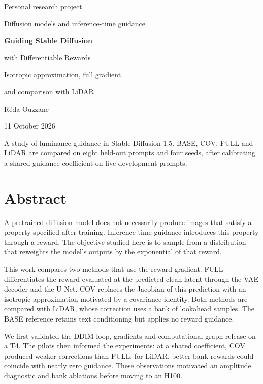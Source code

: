 \documentclass[11pt,a4paper]{article}
\begin{document}
\begin{titlepage}
\centering
\vspace*{1.3cm}
{\large Personal research project\par}
\vspace{0.35cm}
{\large Diffusion models and inference-time guidance\par}
\vspace{1.7cm}
{\LARGE\bfseries Guiding Stable Diffusion\par with Differentiable Rewards\par}
\vspace{0.6cm}
{\large Isotropic approximation, full gradient\par and comparison with LiDAR\par}
\vspace{1.7cm}
{\Large Réda Ouzzane\par}
\vspace{0.6cm}
{11 October 2026\par}
\vfill
\begin{minipage}{0.88\textwidth}
\small
A study of luminance guidance in Stable Diffusion 1.5. BASE, COV, FULL and LiDAR are compared on eight held-out prompts and four seeds, after calibrating a shared guidance coefficient on five development prompts.
\end{minipage}
\vspace{0.9cm}
\end{titlepage}

\section*{Abstract}
A pretrained diffusion model does not necessarily produce images that satisfy a property specified after training. Inference-time guidance introduces this property through a reward. The objective studied here is to sample from a distribution that reweights the model's outputs by the exponential of that reward.

This work compares two methods that use the reward gradient. FULL differentiates the reward evaluated at the predicted clean latent through the VAE decoder and the U-Net. COV replaces the Jacobian of this prediction with an isotropic approximation motivated by a covariance identity. Both methods are compared with LiDAR, whose correction uses a bank of lookahead samples. The BASE reference retains text conditioning but applies no reward guidance.

We first validated the DDIM loop, gradients and computational-graph release on a T4. The pilots then informed the experiments: at a shared coefficient, COV produced weaker corrections than FULL; for LiDAR, better bank rewards could coincide with nearly zero guidance. These observations motivated an amplitude diagnostic and bank ablations before moving to an H100.
\end{document}
